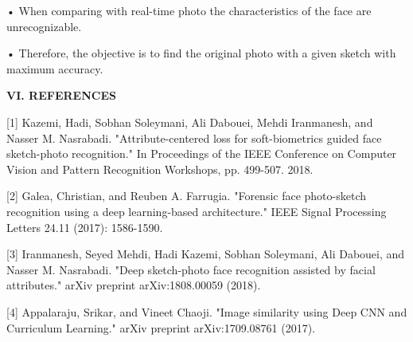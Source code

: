 \documentclass[journal]{IEEEtran} %
\begin{document}
•	When comparing with real-time photo the characteristics of the face are unrecognizable.

•	Therefore, the objective is to find the original photo with a given sketch with maximum accuracy.

\vspace
\textbf{\textbf{VI. REFERENCES}}

[1] Kazemi, Hadi, Sobhan Soleymani, Ali Dabouei, Mehdi Iranmanesh, and Nasser M. Nasrabadi. "Attribute-centered loss for soft-biometrics guided face sketch-photo recognition." In Proceedings of the IEEE Conference on Computer Vision and Pattern Recognition Workshops, pp. 499-507. 2018. 

[2] Galea, Christian, and Reuben A. Farrugia. "Forensic face photo-sketch recognition using a deep learning-based architecture." IEEE Signal Processing Letters 24.11 (2017): 1586-1590. 

[3] Iranmanesh, Seyed Mehdi, Hadi Kazemi, Sobhan Soleymani, Ali Dabouei, and Nasser M. Nasrabadi. "Deep sketch-photo face recognition assisted by facial attributes." arXiv preprint arXiv:1808.00059 (2018). 

[4] Appalaraju, Srikar, and Vineet Chaoji. "Image similarity using Deep CNN and Curriculum Learning." arXiv preprint arXiv:1709.08761 (2017). 
\end{document}
